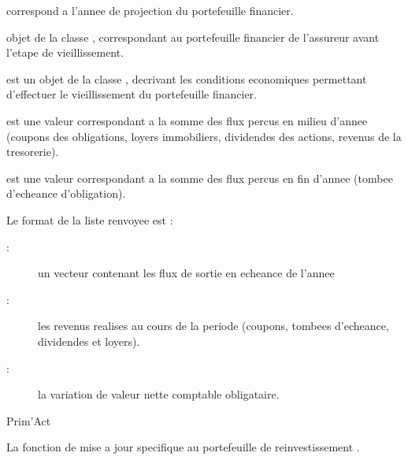 \documentclass[a4paper]{book}
\begin{document}
%
\begin{Arguments}
\begin{ldescription}
\item[\code{an}]  correspond a l'annee de projection du portefeuille financier.

\item[\code{x}] objet de la classe , correspondant au portefeuille financier de l'assureur avant l'etape de vieillissement.

\item[\code{new\_mp\_ESG}] est un objet de la classe , decrivant les conditions economiques permettant d'effectuer le vieillissement du portefeuille financier.

\item[\code{flux\_milieu}] est une valeur  correspondant a la somme des flux percus en milieu d'annee (coupons des obligations, loyers immobiliers, dividendes des actions, revenus de la tresorerie).

\item[\code{flux\_fin}] est une valeur   correspondant a la somme des flux percus en fin d'annee (tombee d'echeance d'obligation).
\end{ldescription}
\end{Arguments}
%
\begin{Value}
Le format de la liste renvoyee est :
\begin{description}

\item[ : ] un vecteur contenant les flux de sortie en echeance de l'annee
\item[ : ] les revenus realises au cours de la periode (coupons, tombees d'echeance, dividendes et loyers).
\item[ : ] la variation de valeur nette comptable obligataire.
\end{description}

\end{Value}
%
\begin{Author}\relax
Prim'Act
\end{Author}
%
\begin{SeeAlso}\relax
La fonction de mise a jour specifique au portefeuille de reinvestissement .
\end{SeeAlso}
\end{document}
